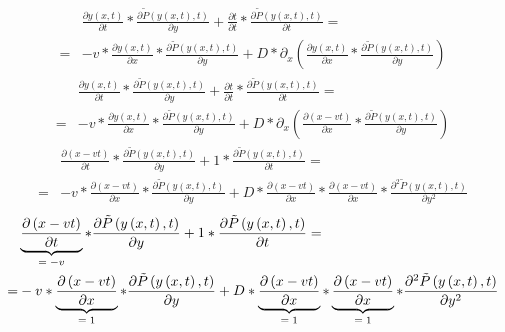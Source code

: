 \begin{align}
    &\frac{\partial y \left( x, t \right)}{\partial t} * \frac{\partial \tilde{P} \left( y \left( x, t \right), t \right)}{\partial y}
    +
    \frac{\partial t}{\partial t} * \frac{\partial \tilde{P} \left( y \left( x, t \right), t \right)}{\partial t}
    = \nonumber \\
    =&
    -
    v * \frac{\partial y \left( x, t \right)}{\partial x} * \frac{\partial \tilde{P} \left( y \left( x, t \right), t \right)}{\partial y}
    +
    D * \partial_{x} \left( \frac{\partial y \left( x, t \right)}{\partial x} * \frac{\partial \tilde{P} \left( y \left( x, t \right), t \right)}{\partial y} \right)
\end{align}
\hrulefill
\begin{align}
    &\frac{\partial y \left( x, t \right)}{\partial t} * \frac{\partial \tilde{P} \left( y \left( x, t \right), t \right)}{\partial y}
    +
    \frac{\partial t}{\partial t} * \frac{\partial \tilde{P} \left( y \left( x, t \right), t \right)}{\partial t}
    = \nonumber \\
    =&
    -
    v * \frac{\partial y \left( x, t \right)}{\partial x} * \frac{\partial \tilde{P} \left( y \left( x, t \right), t \right)}{\partial y}
    +
    D * \partial_{x} \left( \frac{\partial \left( x - vt \right)}{\partial x} * \frac{\partial \tilde{P} \left( y \left( x, t \right), t \right)}{\partial y} \right)
\end{align}
\hrulefill
\begin{align}
    &\frac{\partial \left( x - vt \right)}{\partial t} * \frac{\partial \tilde{P} \left( y \left( x, t \right), t \right)}{\partial y}
    +
    1 * \frac{\partial \tilde{P} \left( y \left( x, t \right), t \right)}{\partial t}
    = \nonumber \\
    =&
    -
    v * \frac{\partial \left( x - vt \right)}{\partial x} * \frac{\partial \tilde{P} \left( y \left( x, t \right), t \right)}{\partial y}
    +
    D * \frac{\partial \left( x - vt \right)}{\partial x} * \frac{\partial \left( x - vt \right)}{\partial x} * \frac{\partial^{2} \tilde{P} \left( y \left( x, t \right), t \right)}{\partial y^{2}}
\end{align}
\hrulefill
\begin{align}
    &\underbrace{\frac{\partial \left( x - vt \right)}{\partial t}}_{\text{\normalfont $= -v$}} * \frac{\partial \tilde{P} \left( y \left( x, t \right), t \right)}{\partial y}
    +
    1 * \frac{\partial \tilde{P} \left( y \left( x, t \right), t \right)}{\partial t}
    = \nonumber \\
    =&
    -
    v * \underbrace{\frac{\partial \left( x - vt \right)}{\partial x}}_{\text{\normalfont $= 1$}} * \frac{\partial \tilde{P} \left( y \left( x, t \right), t \right)}{\partial y}
    +
    D * \underbrace{\frac{\partial \left( x - vt \right)}{\partial x}}_{\text{\normalfont $= 1$}} * \underbrace{\frac{\partial \left( x - vt \right)}{\partial x}}_{\text{\normalfont $= 1$}} * \frac{\partial^{2} \tilde{P} \left( y \left( x, t \right), t \right)}{\partial y^{2}}
\end{align}
